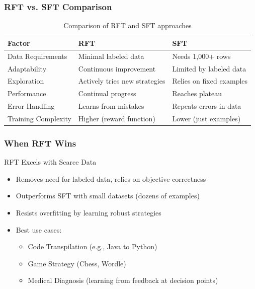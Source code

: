 \documentclass[aspectratio=169]{beamer}
\begin{document}
\begin{frame}
	\frametitle{RFT vs. SFT Comparison}
	\begin{table}
		\footnotesize
		\begin{tabular}{|p{3cm}|p{3cm}|p{3cm}|}
			\hline
			\textbf{Factor} & \textbf{RFT} & \textbf{SFT} \\
			\hline
			Data Requirements & Minimal labeled data & Needs 1,000+ rows \\
			\hline
			Adaptability & Continuous improvement & Limited by labeled data \\
			\hline
			Exploration & Actively tries new strategies & Relies on fixed examples \\
			\hline
			Performance & Continual progress & Reaches plateau \\
			\hline
			Error Handling & Learns from mistakes & Repeats errors in data \\
			\hline
			Training Complexity & Higher (reward function) & Lower (just examples) \\
			\hline
		\end{tabular}
		\caption{Comparison of RFT and SFT approaches}
	\end{table}
\end{frame}

\begin{frame}
	\frametitle{When RFT Wins}
	\begin{block}{RFT Excels with Scarce Data}
		\begin{itemize}
			\item Removes need for labeled data, relies on objective correctness
			\item Outperforms SFT with small datasets (dozens of examples)
			\item Resists overfitting by learning robust strategies
			\item Best use cases:
			\begin{itemize}
				\item Code Transpilation (e.g., Java to Python)
				\item Game Strategy (Chess, Wordle)
				\item Medical Diagnosis (learning from feedback at decision points)
			\end{itemize}
		\end{itemize}
	\end{block}
\end{frame}
\end{document}
